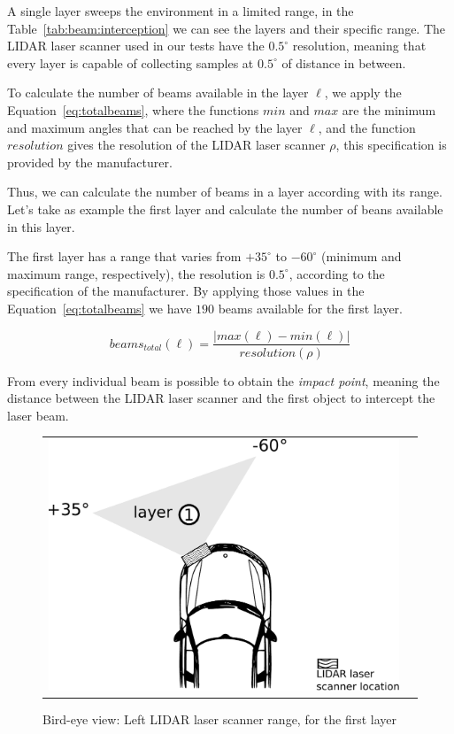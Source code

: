 A single layer sweeps the environment in a limited range, in the Table~\ref{tab:beam:interception} we can see the layers and their specific range. The LIDAR laser scanner used in our tests have the $0.5^{\circ}$ resolution, meaning that every layer is capable of collecting samples at $0.5^{\circ}$ of distance in between. 

To calculate the number of beams available in the layer $\ell$, we apply the Equation~\ref{eq:totalbeams}, where the functions $min$ and $max$ are the minimum and maximum angles that can be reached by the layer $\ell$, and the function $resolution$ gives the resolution of the LIDAR laser scanner $\rho$, this specification is provided by the manufacturer. 

Thus, we can calculate the number of beams in a layer according with its range. Let's take as example the first layer and calculate the number of beans available in this layer. 

The first layer has a range that varies from $+35^\circ$ to $-60^\circ$ (minimum and maximum range, respectively), the resolution is $0.5^\circ$, according to the specification of the manufacturer. By applying those values in the Equation~\ref{eq:totalbeams} we have $190$ beams available for the first layer.

\begin{equation}
\label{eq:totalbeams}
beams_{total}(\ell)=\frac{|max(\ell)-min(\ell)|}{resolution(\rho)}
\end{equation}


From every individual beam is possible to obtain the \textit{impact point}, meaning the distance between the LIDAR laser scanner and the first object to intercept the laser beam.

\begin{figure}[h]
   \centering
     \begin{tabular}{lr}
       \includegraphics[scale=0.5]{img/fig:demonstrator:superior}
     \end{tabular}
   \caption{Bird-eye view: Left LIDAR laser scanner range, for the first layer}
   \label{fig:demonstrator:superior}
\end{figure}


